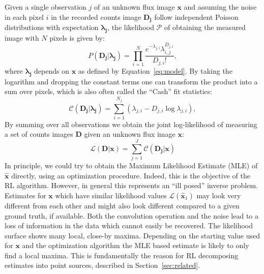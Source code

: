 \documentclass[twocolumn]{aastex631}
\begin{document}
    Given a single observation $j$ of an unknown flux image $\mathbf{x}$ and assuming the noise in each pixel $i$ in the recorded counts image $\mathbf{D_j}$ follow independent Poisson distributions with expectation $\boldsymbol{\lambda_j}$, the likelihood $\mathcal{P}$
    of obtaining the measured image with $N$ pixels is given by:
    \begin{equation}
        \label{eq:poisson}
        P\left( \mathbf{D_j} | \boldsymbol{\lambda_j} \right) = \prod_{i=1}^N \frac{{e^{ - \lambda_{j,i} } \lambda_{i,j} ^ {D_{j,i}}}}{{D_{j,i}!}},
    \end{equation}
    where $\boldsymbol{\lambda_j}$ depends on $\mathbf{x}$ as defined by Equation~\ref{eq:model}. By taking the logarithm and dropping the constant terms one can transform the product into a sum over pixels, which is also often called the \enquote{Cash} \citep{Cash1979} fit statistics:
    \begin{equation}
        \label{eq:cash}
        \mathcal{C}\left( \mathbf{D_j} | \boldsymbol{\lambda_j} \right) = \sum_{i=1}^{N_j} \left(\lambda_{j,i} - D_{j, i} \log{\lambda_{j,i}}\right),
    \end{equation}
    By summing over all observations we obtain the joint log-likelihood of measuring a set of counts images $\mathbf{D}$ given an unknown flux image $\mathbf{x}$:
    \begin{equation}
        \label{eq:joint}
        \mathcal{L}\left( \mathbf{D} | \mathbf{x} \right) = \sum_{j=1}^J \mathcal{C}\left( \mathbf{D_j} | \mathbf{x} \right)
    \end{equation}
    In principle, we could try to obtain the Maximum Likelihood Estimate (MLE) of $\hat{\mathbf{x}}$ directly, using an optimization procedure. Indeed, this is the objective of the RL algorithm.  However, in general this represents an \enquote{ill posed} inverse problem. Estimates for $\mathbf{x}$ which have similar likelihood values $\mathcal{L}(\hat{\mathbf{x}}_1)$ may look very different from each other and might also look different compared to a given ground truth, if available. Both the convolution operation
    and the noise lead to a loss of information in the data which cannot easily be recovered. The likelihood surface shows many local, close-by maxima. Depending on the starting value used for $\mathbf{x}$ and the optimization algorithm the MLE based estimate is likely to only find a local maxima. This is fundamentally the reason for RL decomposing estimates into point sources, described in Section~\ref{sec:related}.
    
\end{document}
